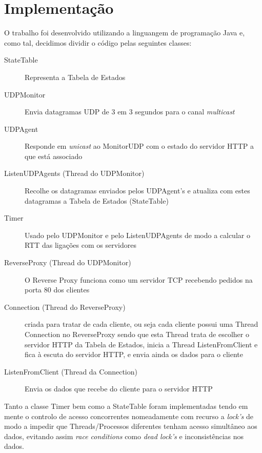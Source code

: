 \documentclass{article}
\begin{document}
\section{Implementação}
O trabalho foi desenvolvido utilizando a linguangem de programação Java e, como tal, decidimos dividir o código pelas seguintes classes:
\begin{description}
    \item [StateTable] Representa a Tabela de Estados
    \item [UDPMonitor] Envia datagramas UDP de 3 em 3 segundos para o canal \textit{multicast} 
    \item [UDPAgent] Responde em \textit{unicast} ao MonitorUDP com o estado do servidor HTTP a que está associado
    \item [ListenUDPAgents (Thread do UDPMonitor)] Recolhe os datagramas enviados pelos UDPAgent's e atualiza com estes datagramas a Tabela de Estados (StateTable)
    \item [Timer] Usado pelo UDPMonitor e pelo ListenUDPAgents de modo a calcular o RTT das ligações com os servidores
    \item [ReverseProxy (Thread do UDPMonitor)] O Reverse Proxy funciona como um servidor TCP recebendo pedidos na porta 80 dos clientes
    \item [Connection (Thread do ReverseProxy)] criada para tratar de cada cliente, ou seja cada cliente possui uma Thread Connection no ReverseProxy sendo que esta Thread trata de escolher o servidor HTTP da Tabela de Estados, inicia a Thread ListenFromClient e fica à escuta do servidor HTTP, e envia ainda os dados para o cliente
    \item [ListenFromClient (Thread da Connection)] Envia os dados que recebe do cliente para o servidor HTTP
\end{description}

Tanto a classe Timer bem como a StateTable foram implementadas tendo em mente o controlo de acesso concorrentes nomeadamente com recurso a \textit{lock's} de modo a impedir que Threads/Processos diferentes tenham acesso simultâneo aos dados, evitando assim \textit{race conditions} como \textit{dead lock's} e inconsistências nos dados.
\end{document}
